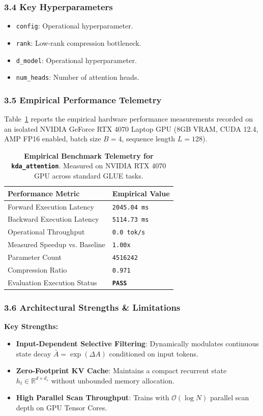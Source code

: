 \subsubsection*{3.4 Key Hyperparameters}
\begin{itemize}
    \item \texttt{config}: Operational hyperparameter.
    \item \texttt{rank}: Low-rank compression bottleneck.
    \item \texttt{d\_model}: Operational hyperparameter.
    \item \texttt{num\_heads}: Number of attention heads.
\end{itemize}

\subsubsection*{3.5 Empirical Performance Telemetry}
Table~\ref{tab:telemetry_kda\_attention} reports the empirical hardware performance measurements recorded on an isolated NVIDIA GeForce RTX 4070 Laptop GPU (8GB VRAM, CUDA 12.4, AMP FP16 enabled, batch size $B=4$, sequence length $L=128$).

\begin{table}[h]
\centering
\small
\caption{\textbf{Empirical Benchmark Telemetry for \texttt{kda\_attention}}. Measured on NVIDIA RTX 4070 GPU across standard GLUE tasks.}
\label{tab:telemetry_kda\_attention}
\begin{tabularx}{\columnwidth}{lX}
\toprule
\textbf{Performance Metric} & \textbf{Empirical Value} \\
\midrule
Forward Execution Latency & \texttt{2045.04 ms} \\
Backward Execution Latency & \texttt{5114.73 ms} \\
Operational Throughput & \texttt{0.0 tok/s} \\
Measured Speedup vs. Baseline & \texttt{1.00x} \\
Parameter Count & \texttt{4516242} \\
Compression Ratio & \texttt{0.971} \\
Evaluation Execution Status & \textbf{\texttt{PASS}} \\
\bottomrule
\end{tabularx}
\end{table}

\subsubsection*{3.6 Architectural Strengths \& Limitations}
\textbf{Key Strengths:}
\begin{itemize}
    \item \textbf{Input-Dependent Selective Filtering}: Dynamically modulates continuous state decay $\bar{A} = \exp(\Delta A)$ conditioned on input tokens.
    \item \textbf{Zero-Footprint KV Cache}: Maintains a compact recurrent state $h_t \in \mathbb{R}^{d \times d_s}$ without unbounded memory allocation.
    \item \textbf{High Parallel Scan Throughput}: Trains with $\mathcal{O}(\log N)$ parallel scan depth on GPU Tensor Cores.
\end{itemize}

